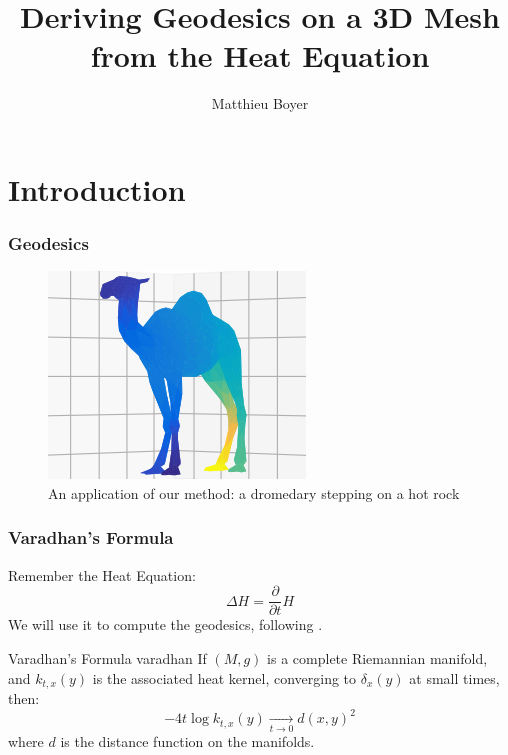 \documentclass{beamercours}
\title{Deriving Geodesics on a 3D Mesh from the Heat Equation}
\author{Matthieu Boyer}
\begin{document}
\maketitle

\section{Introduction}
\begin{frame}
	\frametitle{Geodesics}
	\begin{figure}[h]
	\centering
	\includegraphics{Figures/camel_geodesics.png}
	\caption{An application of our method: a dromedary stepping on a hot rock}
	\label{camel}
\end{figure}
\end{frame}

\begin{frame}[allowframebreaks]
	\frametitle{Varadhan's Formula}
	Remember the Heat Equation:
	\begin{equation}
		\tag{Heat}
		\boxed{\Delta H = \frac{\partial}{\partial t} H}
	\end{equation}
	We will use it to compute the geodesics, following \cite{heatgeodesics}.
	\framebreak
	\begin{théorème}{Varadhan's Formula \cite{varadhan}}{varadhan}
		If $(M, g)$ is a complete Riemannian manifold, and $k_{t, x}(y)$ is the associated heat kernel, converging to $\delta_{x}(y)$ at small times, then:
		\begin{equation}
			\tag{VF}
			\boxed{-4t \log k_{t, x}(y) \xrightarrow[t \to 0]{} d\left( x, y \right)^{2}}
			\label{varadhanformula}
		\end{equation}
		where $d$ is the distance function on the manifolds.
	\end{théorème}
\end{frame}
\end{document}
